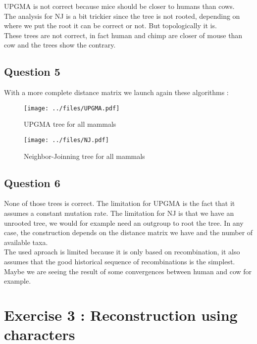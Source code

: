 \documentclass[]{article}
\theoremstyle{definition}
\begin{document}
UPGMA is not correct because mice should be closer to humans than cows.\\
The analysis for NJ is a bit trickier since the tree is not rooted, depending on where we put the root it can be correct or not. But topologically it is.\\
These trees are not correct, in fact human and chimp are closer of mouse than cow and the trees show the contrary. 

\subsection{Question 5}

With a more complete distance matrix we launch again these algorithms :

\begin{figure}[h!]
	\texttt{[image: ../files/UPGMA.pdf]}
	\caption{\label{upgma2} UPGMA tree for all mammals }
\end{figure}

\begin{figure}[h!]
	\texttt{[image: ../files/NJ.pdf]}
	\caption{\label{nj2} Neighbor-Joinning tree for all mammals }
\end{figure}

\subsection{Question 6}

None of those trees is correct. The limitation for UPGMA is the fact that it assumes a constant mutation rate. The limitation for NJ is that we have an unrooted tree, we would for example need an outgroup to root the tree. In any case, the construction depends on the distance matrix we have and the number of available taxa.\\

The used aproach is limited because it is only based on recombination, it also assumes that the good historical sequence of recombinations is the simplest. Maybe we are seeing the result of some convergences between human and cow for example.


\section{Exercise 3 : Reconstruction using characters}
\end{document}
